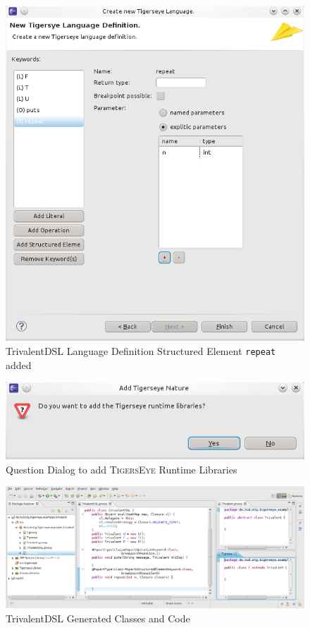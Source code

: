 \documentclass[article,colorback,accentcolor=tud4c]{tudreport}
\newcommand\tiger{%
  \textsc{TigersEye}
}
\begin{document}
	\begin{figure}
	  \centering
	  \includegraphics[scale=.5,keepaspectratio=true]{./pics/example_newlang_structuredelementadded.png}
	  \caption{TrivalentDSL Language Definition Structured Element \texttt{repeat} added}\label{fig:example_newlang_structuredelementadded}
	\end{figure}
	
	\begin{figure}
	  \centering
	  \includegraphics[scale=.5,keepaspectratio=true]{./pics/example_newlang_addruntime.png}
	  \caption{Question Dialog to add \tiger Runtime Libraries}\label{fig:example_newlang_addruntime}
	\end{figure}

	\begin{figure}
	  \centering
	  \includegraphics[scale=.5,keepaspectratio=true]{./pics/example_newlang_generatedcode.png}
	  \caption{TrivalentDSL Generated Classes and Code}\label{fig:example_newlang_generatedcode}
	\end{figure}
\end{document}
